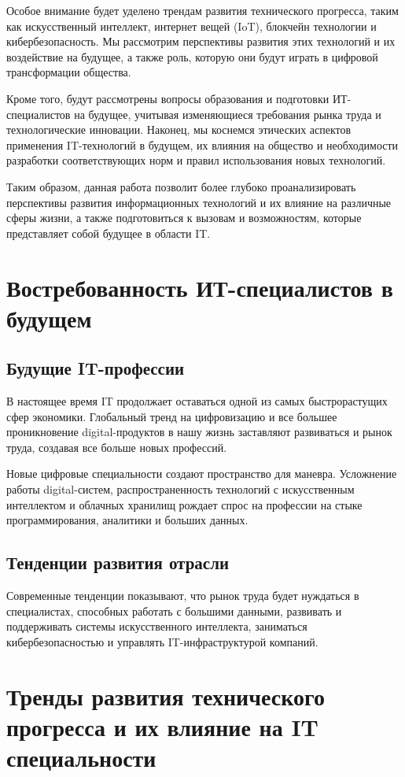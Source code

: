 Особое внимание будет уделено трендам развития технического прогресса, таким как искусственный интеллект, интернет вещей (IoT), блокчейн технологии и кибербезопасность. Мы рассмотрим перспективы развития этих технологий и их воздействие на будущее, а также роль, которую они будут играть в цифровой трансформации общества.

Кроме того, будут рассмотрены вопросы образования и подготовки ИТ-специалистов на будущее, учитывая изменяющиеся требования рынка труда и технологические инновации. Наконец, мы коснемся этических аспектов применения IT-технологий в будущем, их влияния на общество и необходимости разработки соответствующих норм и правил использования новых технологий.

Таким образом, данная работа позволит более глубоко проанализировать перспективы развития информационных технологий и их влияние на различные сферы жизни, а также подготовиться к вызовам и возможностям, которые представляет собой будущее в области IT.

\section{Востребованность ИТ-специалистов в будущем}
\subsection{Будущие IT-профессии}
В настоящее время IT продолжает оставаться одной из самых быстрорастущих сфер экономики. Глобальный тренд на цифровизацию и все большее проникновение digital-продуктов в нашу жизнь заставляют развиваться и рынок труда, создавая все больше новых профессий.

Новые цифровые специальности создают пространство для маневра. Усложнение работы digital-систем, распространенность технологий с искусственным интеллектом и облачных хранилищ рождает спрос на профессии на стыке программирования, аналитики и больших данных.

\subsection{Тенденции развития отрасли}
Современные тенденции показывают, что рынок труда будет нуждаться в специалистах, способных работать с большими данными, развивать и поддерживать системы искусственного интеллекта, заниматься кибербезопасностью и управлять IT-инфраструктурой компаний.

\section{Тренды развития технического прогресса и их влияние на IT специальности}
